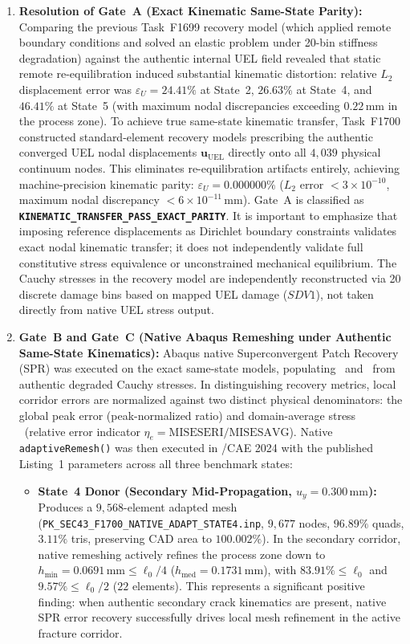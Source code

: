 \begin{enumerate}
  \item \textbf{Resolution of Gate~A (Exact Kinematic Same-State Parity):}
  Comparing the previous Task~F1699 recovery model (which applied remote boundary conditions and solved an elastic problem under 20-bin stiffness degradation) against the authentic internal UEL field revealed that static remote re-equilibration induced substantial kinematic distortion: relative $L_2$ displacement error was $\varepsilon_U = 24.41\%$ at State~2, $26.63\%$ at State~4, and $46.41\%$ at State~5 (with maximum nodal discrepancies exceeding $0.22\,\mathrm{mm}$ in the process zone). To achieve true same-state kinematic transfer, Task~F1700 constructed standard-element recovery models prescribing the authentic converged UEL nodal displacements $\mathbf{u}_{\mathrm{UEL}}$ directly onto all $4{,}039$ physical continuum nodes. This eliminates re-equilibration artifacts entirely, achieving machine-precision kinematic parity: $\varepsilon_U = 0.000000\%$ ($L_2$ error $< 3 \times 10^{-10}$, maximum nodal discrepancy $< 6 \times 10^{-11}\,\mathrm{mm}$). Gate~A is classified as \textbf{\texttt{KINEMATIC\_TRANSFER\_PASS\_EXACT\_PARITY}}.
  It is important to emphasize that imposing reference displacements as Dirichlet boundary constraints validates exact nodal kinematic transfer; it does not independently validate full constitutive stress equivalence or unconstrained mechanical equilibrium. The Cauchy stresses in the recovery model are independently reconstructed via 20 discrete damage bins based on mapped UEL damage ($SDV1$), not taken directly from native UEL stress output.
  \item \textbf{Gate~B and Gate~C (Native Abaqus Remeshing under Authentic Same-State Kinematics):}
  Abaqus native Superconvergent Patch Recovery (SPR) was executed on the exact same-state models, populating \MISESERI\ and \MISESAVG\ from authentic degraded Cauchy stresses. In distinguishing recovery metrics, local corridor errors are normalized against two distinct physical denominators: the global peak error (peak-normalized ratio) and domain-average stress \MISESAVG\ (relative error indicator $\eta_e = \text{MISESERI} / \text{MISESAVG}$). Native \texttt{adaptiveRemesh()} was then executed in \Abaqus/CAE 2024 with the published Listing~1 parameters across all three benchmark states:
  \begin{itemize}
    \item \textbf{State~4 Donor (Secondary Mid-Propagation, $u_y = 0.300\,\mathrm{mm}$):} Produces a $9{,}568$-element adapted mesh (\texttt{PK\_SEC43\_F1700\_NATIVE\_ADAPT\_STATE4.inp}, $9{,}677$ nodes, $96.89\%$ quads, $3.11\%$ tris, preserving CAD area to $100.002\%$). In the secondary corridor, native remeshing actively refines the process zone down to $h_{\min} = 0.0691\,\mathrm{mm} \le \ell_0/4$ ($h_{\mathrm{med}} = 0.1731\,\mathrm{mm}$), with $83.91\% \le \ell_0$ and $9.57\% \le \ell_0/2$ ($22$ elements). This represents a significant positive finding: when authentic secondary crack kinematics are present, native SPR error recovery successfully drives local mesh refinement in the active fracture corridor.

\end{itemize}
\end{enumerate}
